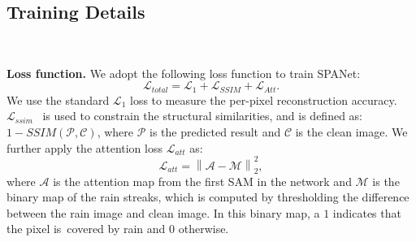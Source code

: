 \documentclass[10pt,twocolumn,letterpaper]{article}
\begin{document}
\subsection{Training Details}~\label{sec:train}

{\bf Loss function.} We adopt the following loss function to train SPANet:
\begin{equation}
\mathcal { L }_{total} = \mathcal { L }_{1}  + \mathcal { L }_{SSIM} +\mathcal { L }_{Att}.
\end{equation}
We use the standard $\mathcal{L}_{1}$ loss to measure the per-pixel reconstruction accuracy. $\mathcal{L}_{ssim}$~\cite{wang:tip:2004:ssim} is used to constrain the structural similarities, and is defined as: $1 - SSIM(\mathcal{P},\mathcal{C})$,
where $\mathcal{P}$ is the predicted result and $\mathcal{C}$ is the clean image. 
We further apply the attention loss $\mathcal{L}_{att}$ as:
\begin{equation}
\mathcal { L }_{att} = \left\| \mathcal{A} - \mathcal{M}\right\| _{2} ^{2},
\end{equation}
where $\mathcal{A}$ is the attention map from the first SAM in the network and $\mathcal{M}$ is the binary map of the rain streaks, which is computed by thresholding the difference between the rain image and clean image. In this binary map, a $1$ indicates that the pixel is~covered by rain and $0$ otherwise.
\end{document}
